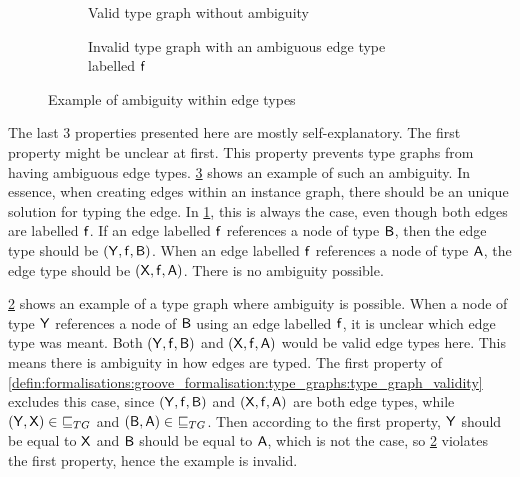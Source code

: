 \begin{figure}
    \centering
    \begin{subfigure}{0.45\textwidth}
        \centering
        
        \caption{Valid type graph without ambiguity}
        \label{fig:formalisations:groove_formalisation:type_graphs:ambiguous_edges_example:valid}
    \end{subfigure}
    \begin{subfigure}{0.45\textwidth}
        \centering
        
        \caption{Invalid type graph with an ambiguous edge type labelled $\mathsf{f}$}
        \label{fig:formalisations:groove_formalisation:type_graphs:ambiguous_edges_example:invalid}
    \end{subfigure}
    \caption{Example of ambiguity within edge types}
    \label{fig:formalisations:groove_formalisation:type_graphs:ambiguous_edges_example}
\end{figure}

The last 3 properties presented here are mostly self-explanatory. The first property might be unclear at first. This property prevents type graphs from having ambiguous edge types. \cref{fig:formalisations:groove_formalisation:type_graphs:ambiguous_edges_example} shows an example of such an ambiguity. In essence, when creating edges within an instance graph, there should be an unique solution for typing the edge. In \cref{fig:formalisations:groove_formalisation:type_graphs:ambiguous_edges_example:valid}, this is always the case, even though both edges are labelled $\mathsf{f}$. If an edge labelled $\mathsf{f}$ references a node of type $\mathsf{B}$, then the edge type should be $( \mathsf{Y}, \mathsf{f}, \mathsf{B} )$. When an edge labelled $\mathsf{f}$ references a node of type $\mathsf{A}$, the edge type should be $( \mathsf{X}, \mathsf{f}, \mathsf{A} )$. There is no ambiguity possible. 

\cref{fig:formalisations:groove_formalisation:type_graphs:ambiguous_edges_example:invalid} shows an example of a type graph where ambiguity is possible. When a node of type $\mathsf{Y}$ references a node of $\mathsf{B}$ using an edge labelled $\mathsf{f}$, it is unclear which edge type was meant. Both $( \mathsf{Y}, \mathsf{f}, \mathsf{B} )$ and $( \mathsf{X}, \mathsf{f}, \mathsf{A} )$ would be valid edge types here. This means there is ambiguity in how edges are typed. The first property of \cref{defin:formalisations:groove_formalisation:type_graphs:type_graph_validity} excludes this case, since $( \mathsf{Y}, \mathsf{f}, \mathsf{B} )$ and $( \mathsf{X}, \mathsf{f}, \mathsf{A} )$ are both edge types, while $(\mathsf{Y}, \mathsf{X}) \in\ \sqsubseteq_{TG}$ and $(\type{B}, \type{A}) \in\ \sqsubseteq_{TG}$. Then according to the first property, $\mathsf{Y}$ should be equal to $\mathsf{X}$ and $\mathsf{B}$ should be equal to $\mathsf{A}$, which is not the case, so \cref{fig:formalisations:groove_formalisation:type_graphs:ambiguous_edges_example:invalid} violates the first property, hence the example is invalid.